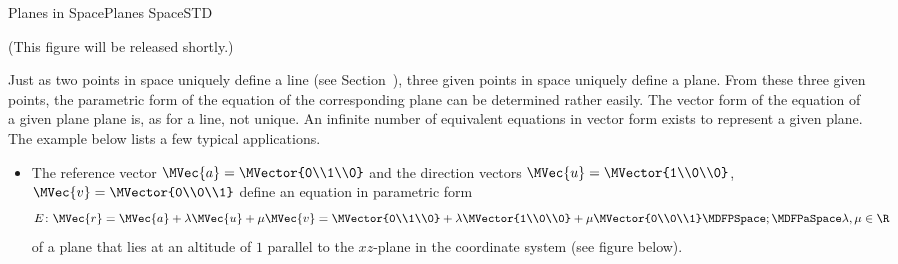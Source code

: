 \begin{MXContent}{Planes in Space}{Planes Space}{STD}
\begin{MInfo}
% 

(This figure will be released shortly.)
\end{MInfo}

Just as two points in space uniquely define a line (see Section~), three 
given points in space uniquely define a plane. From these three given points, the parametric form of the
equation of the corresponding plane can be determined rather easily. The vector form of the equation of a given plane 
plane is, as for a line, not unique. An infinite number of equivalent equations in vector form exists to represent 
a given plane. The example below lists a few typical applications. 


\begin{MExample}
\begin{itemize}
 \item The reference vector $\MVec{a}=\MVector{0\\1\\0}$ and the direction vectors  
  $\MVec{u}=\MVector{1\\0\\0}$, $\MVec{v}=\MVector{0\\0\\1}$ define an equation in parametric form
 \[
  E\colon \MVec{r}=\MVec{a}+\lambda\MVec{u}+\mu\MVec{v}=\MVector{0\\1\\0}+\lambda\MVector{1\\0\\0}+\mu\MVector{0\\0\\1}\MDFPSpace;\MDFPaSpace\lambda,\mu\in\R
 \]
  of a plane that lies at an altitude of $1$ parallel to the $x z$-plane in the coordinate system (see figure below).
 

\end{itemize}
\end{MExample}
\end{MXContent}
